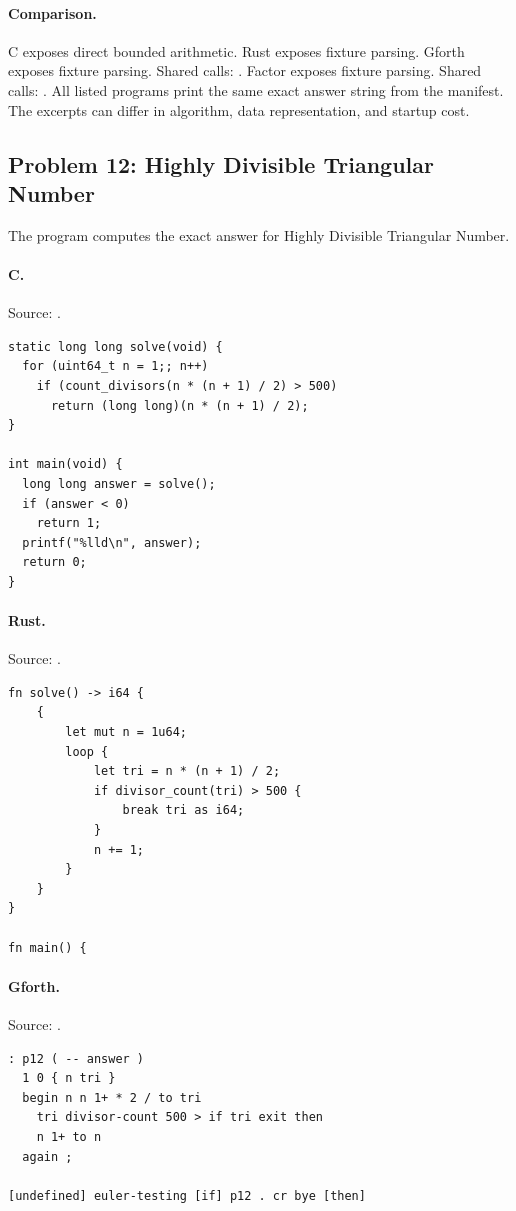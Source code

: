 \paragraph{Comparison.}
C exposes direct bounded arithmetic. Rust exposes fixture parsing. Gforth exposes fixture parsing. Shared calls: \texttt{}. Factor exposes fixture parsing. Shared calls: \texttt{}.
All listed programs print the same exact answer string from the manifest. The excerpts can differ in algorithm, data representation, and startup cost.

\subsection{Problem 12: Highly Divisible Triangular Number}
\label{walkthrough:p12}
The program computes the exact answer for Highly Divisible Triangular Number.

\paragraph{C.} Source: .
\begin{lstlisting}
static long long solve(void) {
  for (uint64_t n = 1;; n++)
    if (count_divisors(n * (n + 1) / 2) > 500)
      return (long long)(n * (n + 1) / 2);
}

int main(void) {
  long long answer = solve();
  if (answer < 0)
    return 1;
  printf("%lld\n", answer);
  return 0;
}
\end{lstlisting}

\paragraph{Rust.} Source: .
\begin{lstlisting}
fn solve() -> i64 {
    {
        let mut n = 1u64;
        loop {
            let tri = n * (n + 1) / 2;
            if divisor_count(tri) > 500 {
                break tri as i64;
            }
            n += 1;
        }
    }
}

fn main() {
\end{lstlisting}

\paragraph{Gforth.} Source: .
\begin{lstlisting}
: p12 ( -- answer )
  1 0 { n tri }
  begin n n 1+ * 2 / to tri
    tri divisor-count 500 > if tri exit then
    n 1+ to n
  again ;

[undefined] euler-testing [if] p12 . cr bye [then]
\end{lstlisting}

